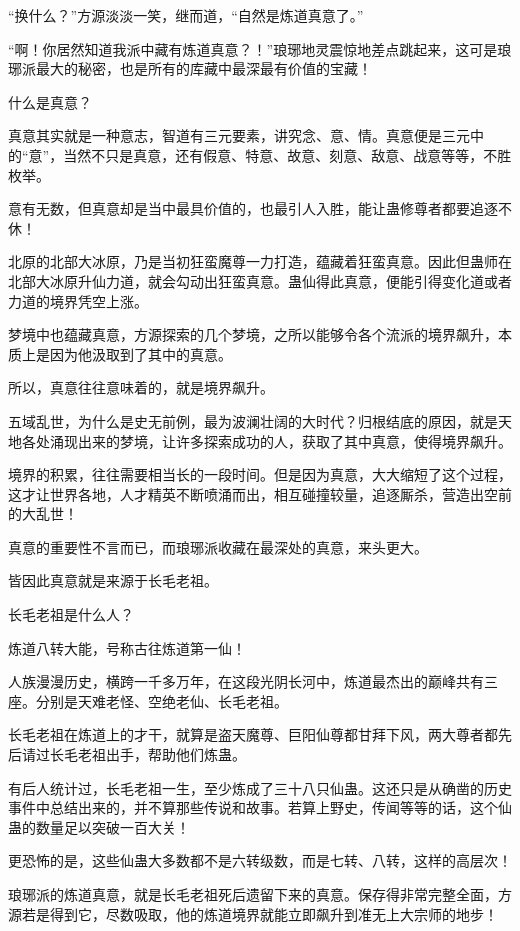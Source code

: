 
\begin{this_body}

“换什么？”方源淡淡一笑，继而道，“自然是炼道真意了。”

“啊！你居然知道我派中藏有炼道真意？！”琅琊地灵震惊地差点跳起来，这可是琅琊派最大的秘密，也是所有的库藏中最深最有价值的宝藏！

什么是真意？

真意其实就是一种意志，智道有三元要素，讲究念、意、情。真意便是三元中的“意”，当然不只是真意，还有假意、特意、故意、刻意、敌意、战意等等，不胜枚举。

意有无数，但真意却是当中最具价值的，也最引人入胜，能让蛊修尊者都要追逐不休！

北原的北部大冰原，乃是当初狂蛮魔尊一力打造，蕴藏着狂蛮真意。因此但蛊师在北部大冰原升仙力道，就会勾动出狂蛮真意。蛊仙得此真意，便能引得变化道或者力道的境界凭空上涨。

梦境中也蕴藏真意，方源探索的几个梦境，之所以能够令各个流派的境界飙升，本质上是因为他汲取到了其中的真意。

所以，真意往往意味着的，就是境界飙升。

五域乱世，为什么是史无前例，最为波澜壮阔的大时代？归根结底的原因，就是天地各处涌现出来的梦境，让许多探索成功的人，获取了其中真意，使得境界飙升。

境界的积累，往往需要相当长的一段时间。但是因为真意，大大缩短了这个过程，这才让世界各地，人才精英不断喷涌而出，相互碰撞较量，追逐厮杀，营造出空前的大乱世！

真意的重要性不言而已，而琅琊派收藏在最深处的真意，来头更大。

皆因此真意就是来源于长毛老祖。

长毛老祖是什么人？

炼道八转大能，号称古往炼道第一仙！

人族漫漫历史，横跨一千多万年，在这段光阴长河中，炼道最杰出的巅峰共有三座。分别是天难老怪、空绝老仙、长毛老祖。

长毛老祖在炼道上的才干，就算是盗天魔尊、巨阳仙尊都甘拜下风，两大尊者都先后请过长毛老祖出手，帮助他们炼蛊。

有后人统计过，长毛老祖一生，至少炼成了三十八只仙蛊。这还只是从确凿的历史事件中总结出来的，并不算那些传说和故事。若算上野史，传闻等等的话，这个仙蛊的数量足以突破一百大关！

更恐怖的是，这些仙蛊大多数都不是六转级数，而是七转、八转，这样的高层次！

琅琊派的炼道真意，就是长毛老祖死后遗留下来的真意。保存得非常完整全面，方源若是得到它，尽数吸取，他的炼道境界就能立即飙升到准无上大宗师的地步！


\end{this_body}
